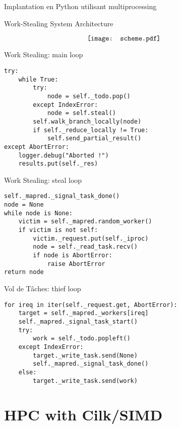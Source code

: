 \documentclass[compress,11pt]{beamer}
\begin{document}
\begin{frame}{Implantation en Python utilisant multiprocessing}

\end{frame}

\begin{frame}{Work-Stealing System Architecture}

\[\hspace{-0.7cm}\texttt{[image: scheme.pdf]}\]
\end{frame}

\begin{frame}[fragile]{Work Stealing: main loop}
\begin{verbatim}
try:
    while True:
        try:
            node = self._todo.pop()
        except IndexError:
            node = self.steal()
        self.walk_branch_locally(node)
        if self._reduce_locally != True:
            self.send_partial_result()
except AbortError:
    logger.debug("Aborted !")
    results.put(self._res)
\end{verbatim}
\end{frame}

\begin{frame}[fragile]{Work Stealing: steal loop}
\begin{verbatim}
self._mapred._signal_task_done()
node = None
while node is None:
    victim = self._mapred.random_worker()
    if victim is not self:
        victim._request.put(self._iproc)
        node = self._read_task.recv()
        if node is AbortError:
            raise AbortError
return node
\end{verbatim}
\end{frame}

\begin{frame}[fragile]{Vol de Tâches: thief loop}
\begin{verbatim}
for ireq in iter(self._request.get, AbortError):
    target = self._mapred._workers[ireq]
    self._mapred._signal_task_start()
    try:
        work = self._todo.popleft()
    except IndexError:
        target._write_task.send(None)
        self._mapred._signal_task_done()
    else:
        target._write_task.send(work)
\end{verbatim}
\end{frame}

\section{HPC with Cilk/SIMD}
\end{document}
